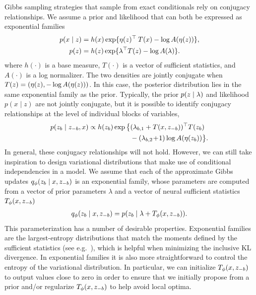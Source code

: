 \documentclass{article}
\theoremstyle{definition}
\begin{document}
Gibbs sampling strategies that sample from exact conditionals rely on conjugacy relationships. We assume a prior and likelihood that can both be expressed as exponential families
\begin{align*}
    p(x \mid z) 
    &= 
    h(x) \exp \{ 
        \eta(z)^\top \: T(x)  
        -\log A(\eta(z)) \}, 
    \\
    p(z ) 
    &= 
    h(z) \exp \{ 
        \lambda^\top T(z) 
        - \log A(\lambda) \}.
\end{align*}
where $h(\cdot)$ is a base measure, $T(\cdot)$ is a vector of sufficient statistics, and $A(\cdot)$ is a log normalizer. The two densities are jointly conjugate when $T(z) = (\eta(z), -\log A(\eta(z)))$.
In this case, the posterior distribution lies in the same exponential family as the prior. Typically, the prior $p(z \mid \lambda)$ and likelihood $p(x \mid z)$ are not jointly conjugate, but it is possible to identify conjugacy relationships at the level of individual blocks of variables, 
\begin{align*}
    p(z_b \mid z_{-b}, x)
    \propto
    h(z_b) 
    \exp \big\{ 
        &
        (\lambda_{b,1} + T(x, z_{-b}))^\top T(z_b) 
        \\
        &
        -
        (\lambda_{b,2} \!+\! 1) 
        \log A(\eta(z_b))
    \big\}
    .
\end{align*}
In general, these conjugacy relationships will not hold. However, we can still take inspiration to design variational distributions that make use of conditional independencies in a model. We assume that each of the approximate Gibbs updates $q_\phi(z_b \mid x, z_{-b})$ is an exponential family, whose parameters are computed from a vector of prior parameters $\lambda$ and a vector of neural sufficient statistics $T_\phi(x, z_{-b})$
\begin{align*}
    q_\phi(z_b \mid x, z_{-b}) 
    = 
    p(z_b \mid \lambda + T_\phi(x, z_{-b}))
    .
\end{align*}
This parameterization has a number of desirable properties. Exponential families are the largest-entropy distributions that match the moments defined by the sufficient statistics (see e.g.~\citet{wainwright2008graphical}), which is helpful when minimizing the inclusive KL divergence. In exponential families it is also more straightforward to control the entropy of the variational distribution. In particular, we can initialize $T_\phi(x, z_{-b})$ to output values close to zero in order to ensure that we initially propose from a prior and/or regularize $T_\phi(x, z_{-b})$ to help avoid local optima.
\end{document}

